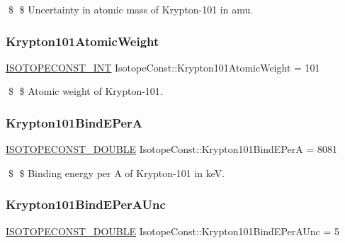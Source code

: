 \$ \$ Uncertainty in atomic mass of Krypton-\/101 in amu. \mbox{\label{group___isotope_const-_krypton-_kr101_ga7256e73fbc35c3a73b7debb729351096}} 
\subsubsection{\texorpdfstring{Krypton101\+Atomic\+Weight}{Krypton101AtomicWeight}}
{\footnotesize\ttfamily \mbox{\hyperlink{group___isotope_const-_macros_ga5f18360b3e99483a35c32d789e62621c}{I\+S\+O\+T\+O\+P\+E\+C\+O\+N\+S\+T\+\_\+\+I\+NT}} Isotope\+Const\+::\+Krypton101\+Atomic\+Weight = 101}

\$ \$ Atomic weight of Krypton-\/101. \mbox{\label{group___isotope_const-_krypton-_kr101_gae74c8533c7649d7c3b6975aab8885152}} 
\subsubsection{\texorpdfstring{Krypton101\+Bind\+E\+PerA}{Krypton101BindEPerA}}
{\footnotesize\ttfamily \mbox{\hyperlink{group___isotope_const-_macros_ga8f45a7272ce02c0b4c65c44636ed719a}{I\+S\+O\+T\+O\+P\+E\+C\+O\+N\+S\+T\+\_\+\+D\+O\+U\+B\+LE}} Isotope\+Const\+::\+Krypton101\+Bind\+E\+PerA = 8081}

\$ \$ Binding energy per A of Krypton-\/101 in keV. \mbox{\label{group___isotope_const-_krypton-_kr101_ga66d61b76ce79067103fc47103073a2d6}} 
\subsubsection{\texorpdfstring{Krypton101\+Bind\+E\+Per\+A\+Unc}{Krypton101BindEPerAUnc}}
{\footnotesize\ttfamily \mbox{\hyperlink{group___isotope_const-_macros_ga8f45a7272ce02c0b4c65c44636ed719a}{I\+S\+O\+T\+O\+P\+E\+C\+O\+N\+S\+T\+\_\+\+D\+O\+U\+B\+LE}} Isotope\+Const\+::\+Krypton101\+Bind\+E\+Per\+A\+Unc = 5}

